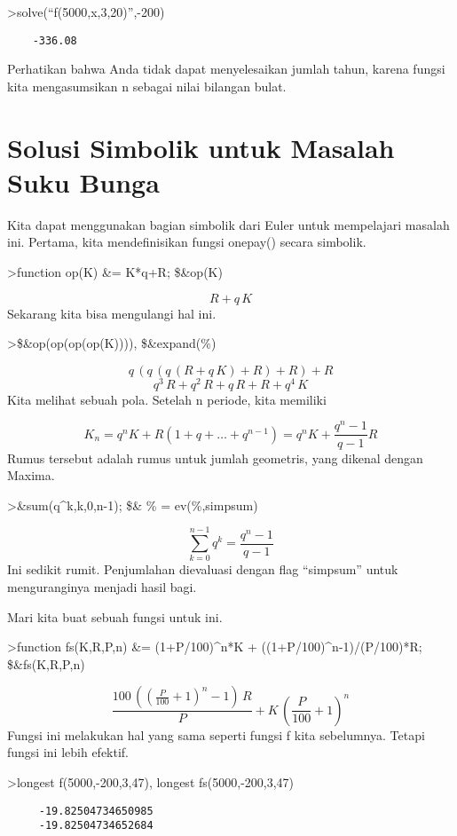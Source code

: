 \documentclass[
]{book}
\begin{document}
\textgreater solve(``f(5000,x,3,20)'',-200)

\begin{verbatim}
    -336.08 
\end{verbatim}

Perhatikan bahwa Anda tidak dapat menyelesaikan jumlah tahun, karena fungsi kita mengasumsikan n sebagai nilai bilangan bulat.

\section{Solusi Simbolik untuk Masalah Suku Bunga}\label{solusi-simbolik-untuk-masalah-suku-bunga}

Kita dapat menggunakan bagian simbolik dari Euler untuk mempelajari masalah ini. Pertama, kita mendefinisikan fungsi onepay() secara simbolik.

\textgreater function op(K) \&= K*q+R; \$\&op(K)

\[R+q\,K\]Sekarang kita bisa mengulangi hal ini.

\textgreater\$\&op(op(op(op(K)))), \$\&expand(\%)

\[q\,\left(q\,\left(q\,\left(R+q\,K\right)+R\right)+R\right)+R\]\[q^3\,R+q^2\,R+q\,R+R+q^4\,K\]Kita melihat sebuah pola. Setelah n periode, kita memiliki

\[K_n = q^n K + R (1+q+\ldots+q^{n-1}) = q^n K + \frac{q^n-1}{q-1} R\]Rumus tersebut adalah rumus untuk jumlah geometris, yang dikenal dengan Maxima.

\textgreater\&sum(q\^{}k,k,0,n-1); \$\& \% = ev(\%,simpsum)

\[\sum_{k=0}^{n-1}{q^{k}}=\frac{q^{n}-1}{q-1}\]Ini sedikit rumit. Penjumlahan dievaluasi dengan flag ``simpsum'' untuk menguranginya menjadi hasil bagi.

Mari kita buat sebuah fungsi untuk ini.

\textgreater function fs(K,R,P,n) \&= (1+P/100)\^{}n*K + ((1+P/100)\^{}n-1)/(P/100)*R; \$\&fs(K,R,P,n)

\[\frac{100\,\left(\left(\frac{P}{100}+1\right)^{n}-1\right)\,R}{P}+K
 \,\left(\frac{P}{100}+1\right)^{n}\]Fungsi ini melakukan hal yang sama seperti fungsi f kita sebelumnya. Tetapi fungsi ini lebih efektif.

\textgreater longest f(5000,-200,3,47), longest fs(5000,-200,3,47)

\begin{verbatim}
     -19.82504734650985 
     -19.82504734652684 
\end{verbatim}
\end{document}
